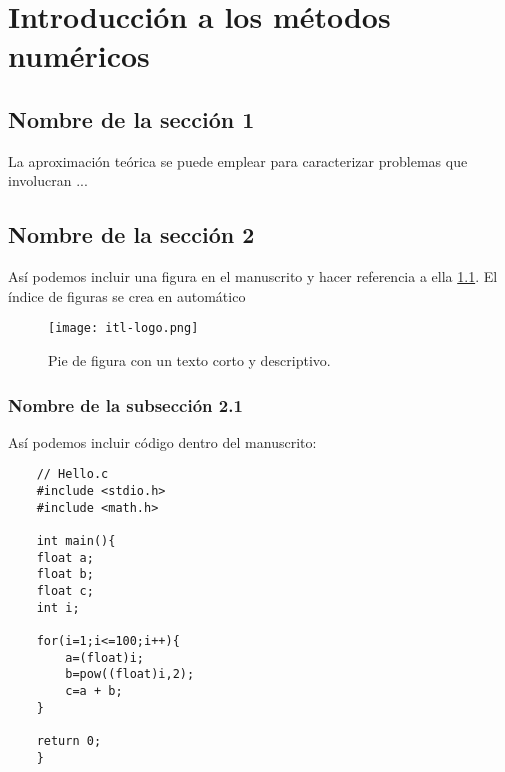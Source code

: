 \chapter{Introducción a los métodos numéricos}

\section{Nombre de la sección 1}
La aproximación teórica \cite{Bloomfield1935} se puede emplear para caracterizar problemas que involucran \cite{Traugott1990}...

\section{Nombre de la sección 2}
Así podemos incluir una figura en el manuscrito y hacer referencia a ella \ref{Fig:01}. El índice de figuras se crea en automático

\begin{figure}[htp!]
	\centering
	\texttt{[image: itl-logo.png]}
	\caption{Pie de figura con un texto corto y descriptivo.}
	\label{Fig:01}
\end{figure}

\subsection{Nombre de la subsección 2.1}
Así podemos incluir código dentro del manuscrito:\\
\begin{lstlisting}
	// Hello.c
	#include <stdio.h>
	#include <math.h>
	
	int main(){
	float a;
	float b;
	float c;	
	int i;
	
	for(i=1;i<=100;i++){
		a=(float)i;
		b=pow((float)i,2);		
		c=a + b;
	}

	return 0;
    }
\end{lstlisting}

